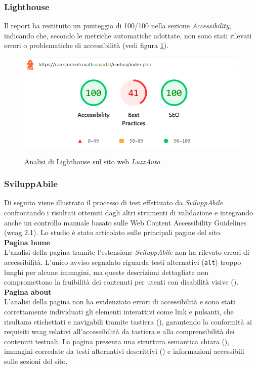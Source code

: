\subsubsection{Lighthouse}
\noindent Il report ha restituito un punteggio di 100/100 nella sezione \textit{Accessibility}, indicando che, secondo le metriche automatiche adottate, non sono stati rilevati errori o problematiche di accessibilità (vedi figura \ref{fig:Lighthouse_luzzauto}).
\begin{figure}[H]
    \centering
    \includegraphics[width=0.6\linewidth, alt={Screenshot dell'analisi di Lighthouse sul sito web LuzzAuto}]{img/Lighthouse_luzzauto.png}
    \caption{Analisi di Lighthouse sul sito web \textit{LuzzAuto}}\label{fig:Lighthouse_luzzauto}
\end{figure}

\subsubsection{SviluppAbile}
\noindent Di seguito viene illustrato il processo di test effettuato da \textit{SviluppAbile} confrontando i risultati ottenuti dagli altri strumenti di validazione e integrando anche un controllo manuale basato sulle Web Content Accessibility Guidelines (\acrshort{wcag} 2.1). Lo studio è stato articolato sulle principali pagine del sito.\\

\noindent \textbf{Pagina home}\\
L’analisi della pagina tramite l’estensione \textit{SviluppAbile} non ha rilevato errori di accessibilità. L’unico avviso segnalato riguarda testi alternativi (\texttt{alt}) troppo lunghi per alcune immagini, ma queste descrizioni dettagliate non compromettono la fruibilità dei contenuti per utenti con disabilità visive ({}). \\

\noindent \textbf{Pagina about}\\
L’analisi della pagina non ha evidenziato errori di accessibilità e sono stati correttamente individuati gli elementi interattivi come link e pulsanti, che risultano etichettati e navigabili tramite tastiera ({}), garantendo la conformità ai requisiti \acrshort{wcag} relativi all’accessibilità da tastiera e alla comprensibilità dei contenuti testuali.  
La pagina presenta una struttura semantica chiara ({}), immagini corredate da testi alternativi descrittivi ({}) e informazioni accessibili sulle sezioni del sito.\\


